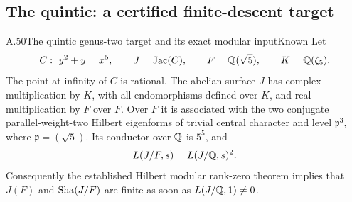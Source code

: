 \subsection{The quintic: a certified finite-descent target}

\begin{statement}{A.50}{The quintic genus-two target and its exact modular input}{Known}
Let
\[
 C:\ y^2+y=x^5,\qquad J=\operatorname{Jac}(C),\qquad
 F=\mathbb Q(\sqrt5),\qquad K=\mathbb Q(\zeta_5).
\]
The point at infinity of $C$ is rational. The abelian surface $J$ has
complex multiplication by $K$, with all endomorphisms defined over $K$,
and real multiplication by $F$ over $F$. Over $F$ it is associated with
the two conjugate parallel-weight-two Hilbert eigenforms of trivial
central character and level $\mathfrak p^3$, where
$\mathfrak p=(\sqrt5)$. Its conductor over $\mathbb Q$ is $5^5$, and
\[
 L(J/F,s)=L(J/\mathbb Q,s)^2.
\]
Consequently the established Hilbert modular rank-zero theorem implies
that $J(F)$ and $\mathop{\mathrm{Sha}}(J/F)$ are finite as soon as $L(J/\mathbb Q,1)\ne0$.
\end{statement}
